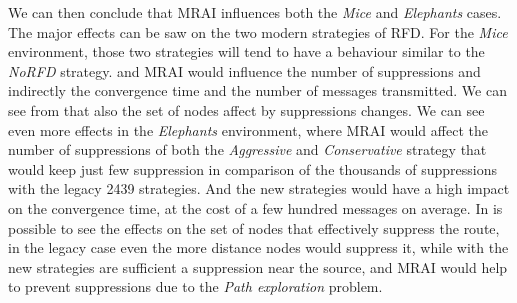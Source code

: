 We can then conclude that \ac{MRAI} influences both the \textit{Mice} and
\textit{Elephants} cases.
The major effects can be saw on the two modern strategies of \ac{RFD}.
For the \textit{Mice} environment, those two strategies will tend to have 
a behaviour similar to the \textit{NoRFD} strategy. and \ac{MRAI} would
influence the number of suppressions and indirectly the convergence time
and the number of messages transmitted.
We can see from  that also the set of
nodes affect by suppressions changes.
We can see even more effects in the \textit{Elephants} environment, where 
\ac{MRAI} would affect the number of suppressions of both the \textit{Aggressive}
and \textit{Conservative} strategy that would keep just few suppression in
comparison of the thousands of suppressions with the legacy \num{2439} strategies.
And the new strategies would have a high impact on the convergence time, at
the cost of a few hundred messages on average.
In  is possible to see the effects
on the set of nodes that effectively suppress the route, in the legacy
case even the more distance nodes would suppress it, while with the new
strategies are sufficient a suppression near the source, and \ac{MRAI} would
help to prevent suppressions due to the \textit{Path exploration} problem.

